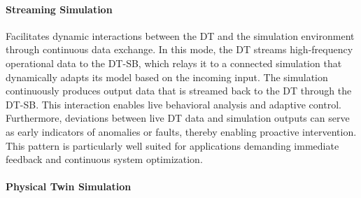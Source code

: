 \paragraph{Streaming Simulation}
\label{ssec:dt-streaming-simulation}

Facilitates dynamic interactions between the DT and the simulation environment through continuous data exchange. In this mode, the DT streams high-frequency operational data to the DT-SB, which relays it to a connected simulation that dynamically adapts its model based on the incoming input. The simulation continuously produces output data that is streamed back to the DT through the DT-SB.
This interaction enables live behavioral analysis and adaptive control.
Furthermore, deviations between live DT data and simulation outputs can serve as early indicators of anomalies or faults, thereby enabling proactive intervention.
This pattern is particularly well suited for applications demanding immediate feedback and continuous system optimization.


\paragraph{Physical Twin Simulation}
\label{ssec:physical-twin-simulation}

